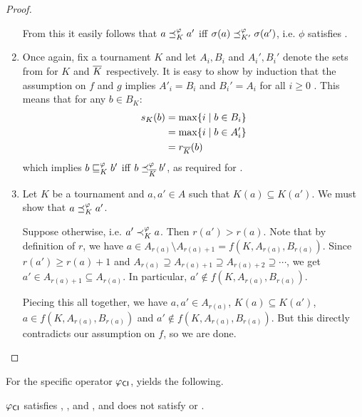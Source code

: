 \begin{proof}
\begin{enumerate}
    From this it easily follows that $a \preceq_K^\varphi a'$ iff $\sigma(a)
            \preceq_{K'}^\varphi \sigma(a')$, i.e.  $\phi$ satisfies \anon{}.

    \item
    Once again, fix a tournament $K$ and let $A_i, B_i$ and $A_i', B_i'$ denote
    the sets from  for $K$ and ${\overline{K}}$ respectively.
    It is easy to show by induction that the assumption on $f$ and $g$ implies
    $A'_i = B_i$ and $B_i' = A_i$ for all $i \ge 0$ . This means that for any
    $b \in B_K$:
    \begin{align*}
        s_K(b)
        &= \max\{i \mid b \in B_i\} \\
        &= \max\{i \mid b \in A_i'\} \\
        &= r_{{\overline{K}}}(b)
    \end{align*}
    which implies $b \sqsubseteq_K^\varphi b'$ iff $b \preceq_{{\overline{K}}}^\varphi b'$, as
    required for \dualaxiom{}.

    \item
    Let $K$ be a tournament and $a, a' \in A$ such that $K(a) \subseteq K(a')$.
    We must show that $a \preceq_K^\varphi a'$.

    Suppose otherwise, i.e. $a' \prec_K^\varphi a$. Then $r(a') > r(a)$. Note that
    by definition of $r$, we have $a \in A_{r(a)} \setminus A_{r(a) + 1} = f(K,
    A_{r(a)}, B_{r(a)})$. Since $r(a') \ge r(a) + 1$ and $A_{r(a)} \supseteq
    A_{r(a) + 1} \supseteq A_{r(a) + 2} \supseteq \cdots$, we get $a' \in
    A_{r(a) + 1} \subseteq A_{r(a)}$. In particular, $a' \notin f(K, A_{r(a)},
    B_{r(a)})$.

    Piecing this all together, we have $a, a' \in A_{r(a)}$, $K(a) \subseteq
    K(a')$, $a \in f(K, A_{r(a)}, B_{r(a)})$ and $a' \not\in f(K, A_{r(a)},
    B_{r(a)})$. But this directly contradicts our assumption on $f$, so we are
    done.
    \end{enumerate}
\end{proof}

For the specific operator ${\varphi_{\mathsf{CI}}}$,
 yields the following.

\begin{theorem}
    \label{tourn_result_phicardint_axioms}

    ${\varphi_{\mathsf{CI}}}$ satisfies \chaindef{}, \anon{},
    \dualaxiom{} and \mon{}, and does not satisfy \iim{} or
    \posresp{}.

\end{theorem}

